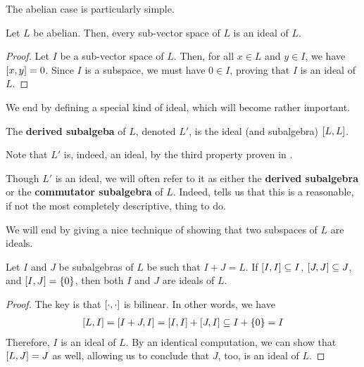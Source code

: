 The abelian case is particularly simple.

\begin{boxproposition}\label{Ch1:Prop:SubspaceIdealOfAbelian}
    Let $L$ be abelian. Then, every sub-vector space of $L$ is an ideal of $L$.
\end{boxproposition}
\begin{proof}
    Let $I$ be a sub-vector space of $L$. Then, for all $x \in L$ and $y \in I$, we have $\left[ x, y \right] = 0$. Since $I$ is a subspace, we must have $0 \in I$, proving that $I$ is an ideal of $L$.
\end{proof}

We end by defining a special kind of ideal, which will become rather important.

\begin{boxdefinition}\label{Ch1:Def:DerivedSubalg}
    The \textbf{derived subalgeba} of $L$, denoted $L'$, is the ideal (and subalgebra) $\left[ L, L \right]$.
\end{boxdefinition}

Note that $L'$ is, indeed, an ideal, by the third property proven in .

\begin{boxconvention}
    Though $L'$ is an ideal, we will often refer to it as either the \textbf{derived subalgebra} or the \textbf{commutator subalgebra} of $L$. Indeed,  tells us that this is a reasonable, if not the most completely descriptive, thing to do.
\end{boxconvention}

We will end by giving a nice technique of showing that two subspaces of $L$ are ideals.

\begin{boxproposition}
    Let $I$ and $J$ be subalgebras of $L$ be such that $I + J = L$. If $\left[ I, I \right] \subseteq I$, $\left[ J, J \right] \subseteq J$, and $\left[ I, J \right] = \left\{ 0 \right\}$, then both $I$ and $J$ are ideals of $L$.
\end{boxproposition}
\begin{proof}
    The key is that $\left[ \cdot, \cdot \right]$ is bilinear. In other words, we have
    \begin{align*}
        \left[ L, I \right] = \left[ I + J, I \right] = \left[ I, I \right] + \left[ J, I \right] \subseteq I + \left\{ 0 \right\} = I
    \end{align*}
    Therefore, $I$ is an ideal of $L$. By an identical computation, we can show that $\left[ L, J \right] = J$ as well, allowing us to conclude that $J$, too, is an ideal of $L$.
\end{proof}

